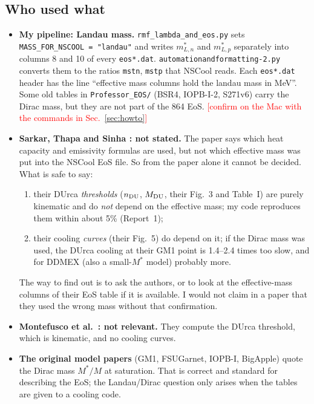 \documentclass[11pt,a4paper]{article}
\newcommand{\fillin}[1]{\textcolor{red}{[#1]}}
\begin{document}
\subsection{Who used what}
\begin{itemize}
\item \textbf{My pipeline: Landau mass.} \texttt{rmf\_lambda\_and\_eos.py} sets \texttt{MASS\_FOR\_NSCOOL = "landau"} and writes $m^*_{L,n}$ and $m^*_{L,p}$ separately into columns 8 and 10 of every \texttt{eos*.dat}. \texttt{automationandformatting-2.py} converts them to the ratios \texttt{mstn}, \texttt{mstp} that NSCool reads. Each \texttt{eos*.dat} header has the line ``effective mass columns hold the landau mass in MeV''. Some old tables in \texttt{Professor\_EOS/} (BSR4, IOPB-I-2, S271v6) carry the Dirac mass, but they are not part of the 864 EoS. \fillin{confirm on the Mac with the commands in Sec.~\ref{sec:howto}}
\item \textbf{Sarkar, Thapa and Sinha \cite{Sarkar2023}: not stated.} The paper says which heat capacity and emissivity formulas are used, but not which effective mass was put into the NSCool EoS file. So from the paper alone it cannot be decided. What is safe to say:
\begin{enumerate}
\item their DUrca \emph{thresholds} ($n_{\rm DU}$, $M_{\rm DU}$, their Fig.~3 and Table~I) are purely kinematic and do \emph{not} depend on the effective mass; my code reproduces them within about 5\% (Report~1);
\item their cooling \emph{curves} (their Fig.~5) do depend on it; if the Dirac mass was used, the DUrca cooling at their GM1 point is 1.4--2.4 times too slow, and for DDMEX (also a small-$M^*$ model) probably more.
\end{enumerate}
The way to find out is to ask the authors, or to look at the effective-mass columns of their EoS table if it is available. I would not claim in a paper that they used the wrong mass without that confirmation.
\item \textbf{Montefusco et al.\ \cite{Montefusco2026}: not relevant.} They compute the DUrca threshold, which is kinematic, and no cooling curves.
\item \textbf{The original model papers} (GM1, FSUGarnet, IOPB-I, BigApple) quote the Dirac mass $M^*/M$ at saturation. That is correct and standard for describing the EoS; the Landau/Dirac question only arises when the tables are given to a cooling code.
\end{itemize}
\end{document}
